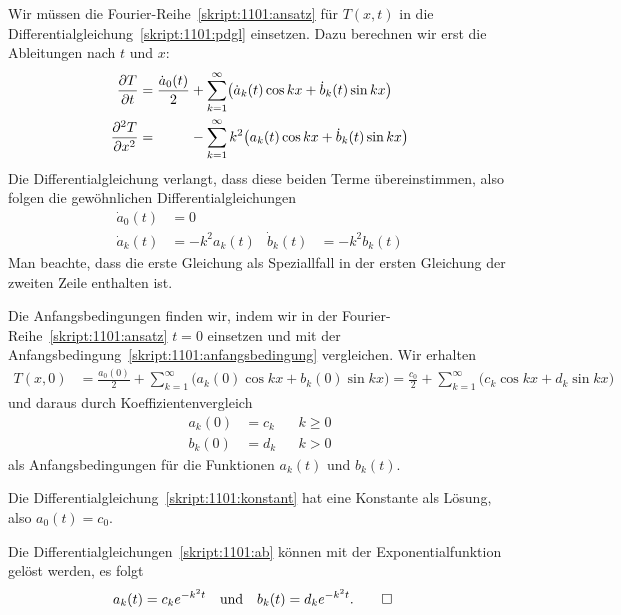 \begin{loesung}
\begin{teilaufgaben}
\item
Wir müssen die Fourier-Reihe~\eqref{skript:1101:ansatz} für
$T(x,t)$ in die Differentialgleichung~\eqref{skript:1101:pdgl}
einsetzen.
Dazu berechnen wir erst die Ableitungen nach $t$ und $x$:
\begin{align*}
\frac{\partial T}{\partial t}
&=
\frac{\dot a_0(t)}{2}
+
\sum_{k=1}^\infty\bigl(\dot a_k(t)\cos kx+\dot b_k(t)\sin kx\bigr)
\\
\frac{\partial^2 T}{\partial x^2}
&=
\phantom{\frac{\dot a_0(t)}{2}}
\mathstrut
-
\sum_{k=1}^\infty k^2\bigl(a_k(t)\cos kx+\dot b_k(t)\sin kx\bigr)
\end{align*}
Die Differentialgleichung verlangt, dass diese beiden Terme übereinstimmen,
also folgen die gewöhnlichen Differentialgleichungen
\begin{align}
\dot a_0(t)&=0
\label{skript:1101:konstant}
\\
\dot a_k(t)&=-k^2 a_k(t)&
\dot b_k(t)&=-k^2 b_k(t)
\label{skript:1101:ab}
\end{align}
Man beachte, dass die erste Gleichung als Speziallfall in der ersten
Gleichung der zweiten Zeile enthalten ist.
\item
Die Anfangsbedingungen finden wir, indem wir in der
Fourier-Reihe~\eqref{skript:1101:ansatz}
$t=0$ einsetzen und mit der 
Anfangsbedingung~\eqref{skript:1101:anfangsbedingung}
vergleichen.
Wir erhalten
\begin{align*}
T(x,0)
&=
\frac{a_0(0)}{2}+\sum_{k=1}^\infty \bigl(a_k(0)\cos kx+b_k(0)\sin kx\bigr)
=
\frac{c_0}2 + \sum_{k=1}^\infty \bigl(c_k\cos kx+d_k\sin kx\bigr)
\end{align*}
und daraus durch Koeffizientenvergleich
\begin{align*}
a_k(0)&=c_k&&k\ge 0\\
b_k(0)&=d_k&&k>0
\end{align*}
als Anfangsbedingungen für die Funktionen $a_k(t)$ und $b_k(t)$.
\item
Die Differentialgleichung~\eqref{skript:1101:konstant} hat eine 
Konstante als Lösung, also $a_0(t)=c_0$.

Die Differentialgleichungen~\eqref{skript:1101:ab} können mit der
Exponentialfunktion gelöst werden, es folgt
\begin{align*}
a_k(t)&=c_ke^{-k^2 t}
&
&\text{und}&
b_k(t)&=d_ke^{-k^2 t}.
\qedhere
\end{align*}
\end{teilaufgaben}
\end{loesung}

